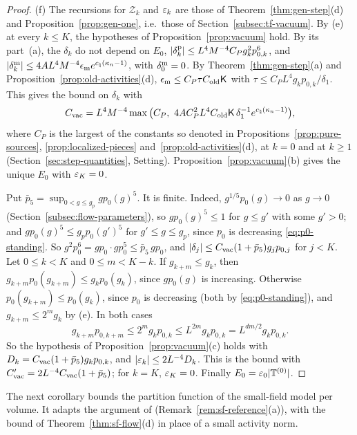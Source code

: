 \begin{proof}
(f) The recursions for $\mathcal Z_k$ and $\varepsilon_k$ are those of Theorem~\ref{thm:gen-step}(d) and Proposition~\ref{prop:gen-one}, i.e.\ those of Section~\ref{subsec:tf-vacuum}. By (e) at every $k\le K$, the hypotheses of Proposition~\ref{prop:vacuum} hold. By its part~(a), the $\delta_k$ do not depend on $E_0$, $|\delta^{\rm p}_k|\le L^4M^{-4}C_Pg_k^2p_{0,k}^6$, and $|\delta^{\rm m}_k|\le4AL^4M^{-4}\epsilon_{\rm m}e^{c_\natural(\kappa_n-1)}$, with $\delta^{\rm m}_0=0$. By Theorem~\ref{thm:gen-step}(a) and Proposition~\ref{prop:old-activities}(d), $\epsilon_{\rm m}\le C_P\tau C_{\rm old}\mathsf K$ with $\tau\le C_PL^4g_kp_{0,k}/\delta_1$. This gives the bound on $\delta_k$ with
\[
C_{\rm vac}=L^4M^{-4}\max\big(C_P,\ 4AC_P^2L^4C_{\rm old}\mathsf K\,\delta_1^{-1}e^{c_\natural(\kappa_n-1)}\big),
\]
where $C_P$ is the largest of the constants so denoted in Propositions~\ref{prop:pure-sources}, \ref{prop:localized-pieces} and~\ref{prop:old-activities}(d), at $k=0$ and at $k\ge1$ (Section~\ref{sec:step-quantities}, Setting). Proposition~\ref{prop:vacuum}(b) gives the unique $E_0$ with $\varepsilon_K=0$.

Put $\bar p_5=\sup_{0<g\le g_p}gp_0(g)^5$. It is finite. Indeed, $g^{1/5}p_0(g)\to0$ as $g\to0$ (Section~\ref{subsec:flow-parameters}), so $gp_0(g)^5\le1$ for $g\le g'$ with some $g'>0$; and $gp_0(g)^5\le g_pp_0(g')^5$ for $g'\le g\le g_p$, since $p_0$ is decreasing \eqref{eq:p0-standing}. So $g^2p_0^6=gp_0\cdot gp_0^5\le\bar p_5\,gp_0$, and $|\delta_j|\le C_{\rm vac}(1+\bar p_5)g_jp_{0,j}$ for $j<K$. Let $0\le k<K$ and $0\le m<K-k$. If $g_{k+m}\le g_k$, then $g_{k+m}p_0(g_{k+m})\le g_kp_0(g_k)$, since $gp_0(g)$ is increasing. Otherwise $p_0(g_{k+m})\le p_0(g_k)$, since $p_0$ is decreasing (both by \eqref{eq:p0-standing}), and $g_{k+m}\le2^mg_k$ by (e). In both cases
\[
g_{k+m}p_{0,k+m}\le2^mg_kp_{0,k}\le L^{2m}g_kp_{0,k}=L^{dm/2}g_kp_{0,k}.
\]
So the hypothesis of Proposition~\ref{prop:vacuum}(c) holds with $D_k=C_{\rm vac}(1+\bar p_5)g_kp_{0,k}$, and $|\varepsilon_k|\le2L^{-4}D_k$. This is the bound with $C'_{\rm vac}=2L^{-4}C_{\rm vac}(1+\bar p_5)$; for $k=K$, $\varepsilon_K=0$. Finally $E_0=\varepsilon_0|\mathbb T^{(0)}|$.
\end{proof}

The next corollary bounds the partition function of the small-field model per volume. It adapts the argument of \cite{DimockI} (Remark~\ref{rem:sf-reference}(a)), with the bound of Theorem~\ref{thm:sf-flow}(d) in place of a small activity norm.

